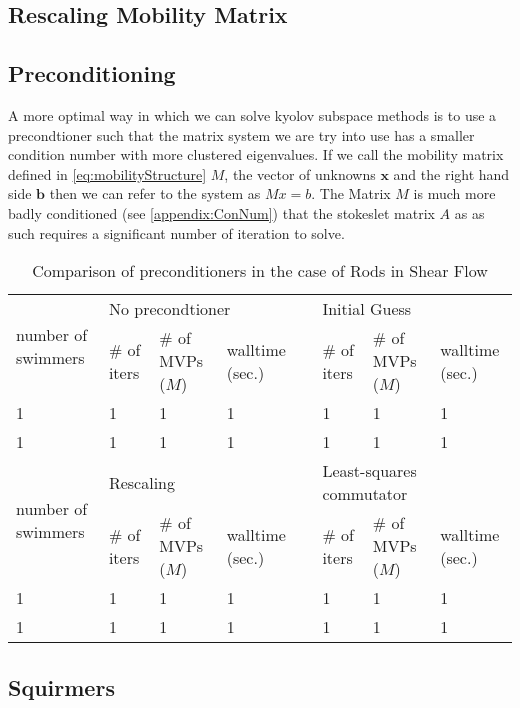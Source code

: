 \subsection{Rescaling Mobility Matrix}

\subsection{Preconditioning}
A more optimal way in which we can solve kyolov subspace methods is to use a precondtioner such that the matrix system we are try into use has a smaller condition number with more clustered eigenvalues. If we call the mobility matrix defined in \cref{eq:mobilityStructure} $M$, the vector of unknowns $\bm{x}$ and the right hand side $\bm{b}$ then we can refer to the system as $Mx=b$. The Matrix $M$ is much more badly conditioned (see \cref{appendix:ConNum}) that the stokeslet matrix $A$ as as such requires a significant number of iteration to solve.

\begin{table}[h]
\begin{singlespace}
\centering
\setlength{\tabcolsep}{6pt}
\renewcommand{\arraystretch}{1}
\small
\begin{tabular}{p{2cm} p{1.5cm} p{1.5cm} p{1.5cm} p{0.1cm} p{1.5cm} p{1.5cm} p{1.5cm}}
\multirow{2}{*}{\parbox{1.8cm}{number of swimmers}} & \multicolumn{3}{l}{No precondtioner} & & \multicolumn{3}{l}{Initial Guess} \\ \cline{2-4} \cline{6-8}
  & \# of iters & \# of MVPs ($M$) & walltime (sec.) & & \# of iters & \# of MVPs ($M$) & walltime (sec.) \\ \hline
  1 & 1 & 1 & 1 & & 1 & 1 & 1 \\
  1 & 1 & 1 & 1 & & 1 & 1 & 1 \\ \hline
  \multirow{2}{*}{\parbox{1.8cm}{number of swimmers}} & \multicolumn{3}{l}{Rescaling} & &\multicolumn{3}{l}{Least-squares commutator} \\ \cline{2-4} \cline{6-8}
  & \# of iters & \# of MVPs ($M$) & walltime (sec.) & & \# of iters & \# of MVPs ($M$) & walltime (sec.) \\ \hline
  1 & 1 & 1 & 1 & & 1 & 1 & 1 \\
  1 & 1 & 1 & 1 & & 1 & 1 & 1 
\end{tabular}
\label{tab:Preconditioning}
\caption{Comparison of preconditioners in the case of Rods in Shear Flow}
\end{singlespace}
\end{table}

\subsection{Squirmers}